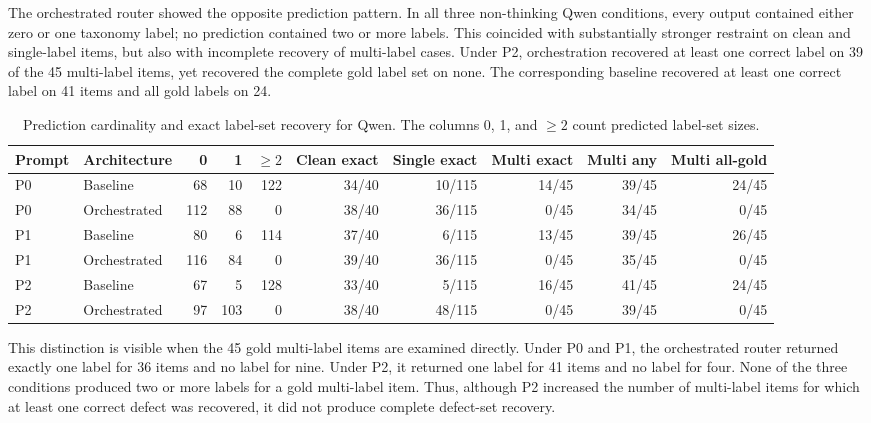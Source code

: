 \documentclass[11pt,a4paper]{article}
\begin{document}
The orchestrated router showed the opposite prediction pattern. In all three
non-thinking Qwen conditions, every output contained either zero or one
taxonomy label; no prediction contained two or more labels. This coincided with
substantially stronger restraint on clean and single-label items, but also with
incomplete recovery of multi-label cases. Under P2, orchestration recovered at
least one correct label on 39 of the 45 multi-label items, yet recovered the
complete gold label set on none. The corresponding baseline recovered at least
one correct label on 41 items and all gold labels on 24.

\begin{table}[htbp]
    \centering
    \caption{Prediction cardinality and exact label-set recovery for Qwen.
    The columns 0, 1, and $\geq 2$ count predicted label-set sizes.}
    \label{tab:qwen-cardinality}
    \small
    \begin{tabular}{llrrrrrrrr}
        \toprule
        Prompt & Architecture & 0 & 1 & $\geq 2$ &
        Clean exact & Single exact & Multi exact & Multi any & Multi all-gold \\
        \midrule
        P0 & Baseline     & 68  & 10  & 122 & 34/40 & 10/115 & 14/45 & 39/45 & 24/45 \\
        P0 & Orchestrated & 112 & 88  & 0   & 38/40 & 36/115 & 0/45  & 34/45 & 0/45  \\
        P1 & Baseline     & 80  & 6   & 114 & 37/40 & 6/115  & 13/45 & 39/45 & 26/45 \\
        P1 & Orchestrated & 116 & 84  & 0   & 39/40 & 36/115 & 0/45  & 35/45 & 0/45  \\
        P2 & Baseline     & 67  & 5   & 128 & 33/40 & 5/115  & 16/45 & 41/45 & 24/45 \\
        P2 & Orchestrated & 97  & 103 & 0   & 38/40 & 48/115 & 0/45  & 39/45 & 0/45  \\
        \bottomrule
    \end{tabular}
\end{table}



This distinction is visible when the 45 gold multi-label items are examined
directly. Under P0 and P1, the orchestrated router returned exactly one label
for 36 items and no label for nine. Under P2, it returned one label for 41
items and no label for four. None of the three conditions produced two or more
labels for a gold multi-label item. Thus, although P2 increased the number of
multi-label items for which at least one correct defect was recovered, it did
not produce complete defect-set recovery.
\end{document}
